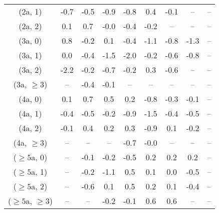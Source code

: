 \begin{table}[h!]
{\begin{tabular}{ccccccccc}
	(2a, 1) & -0.7 & -0.5 & -0.9 & -0.8 & 0.4 & -0.1 & -- & -- \\[0.5ex] 
	(2a, 2) & 0.1 & 0.7 & -0.0 & -0.4 & -0.2 & -- & -- & -- \\[0.5ex] 
	(3a, 0) & 0.8 & -0.2 & 0.1 & -0.4 & -1.1 & -0.8 & -1.3 & -- \\[0.5ex] 
	(3a, 1) & 0.0 & -0.4 & -1.5 & -2.0 & -0.2 & -0.6 & -0.8 & -- \\[0.5ex] 
	(3a, 2) & -2.2 & -0.2 & -0.7 & -0.2 & 0.3 & -0.6 & -- & -- \\[0.5ex] 
	(3a, $\ge3$) & -- & -0.4 & -0.1 & -- & -- & -- & -- & -- \\[0.5ex] 
	(4a, 0) & 0.1 & 0.7 & 0.5 & 0.2 & -0.8 & -0.3 & -0.1 & -- \\[0.5ex] 
	(4a, 1) & -0.4 & -0.5 & -0.2 & -0.9 & -1.5 & -0.4 & -0.5 & -- \\[0.5ex] 
	(4a, 2) & -0.1 & 0.4 & 0.2 & 0.3 & -0.9 & 0.1 & -0.2 & -- \\[0.5ex] 
	(4a, $\ge3$) & -- & -- & -- & -0.7 & -0.0 & -- & -- & -- \\[0.5ex] 
	($\ge5$a, 0) & -- & -0.1 & -0.2 & -0.5 & 0.2 & 0.2 & 0.2 & -- \\[0.5ex] 
	($\ge5$a, 1) & -- & -0.2 & -1.1 & 0.5 & 0.1 & 0.0 & -0.5 & -- \\[0.5ex] 
	($\ge5$a, 2) & -- & -0.6 & 0.1 & 0.5 & 0.2 & 0.1 & -0.4 & -- \\[0.5ex] 
	($\ge5$a, $\ge3$) & -- & -- & -0.2 & -0.1 & 0.6 & 0.6 & -- & -- \\[0.5ex] 
	\hline
	\hline
\end{tabular}}
\end{table}
